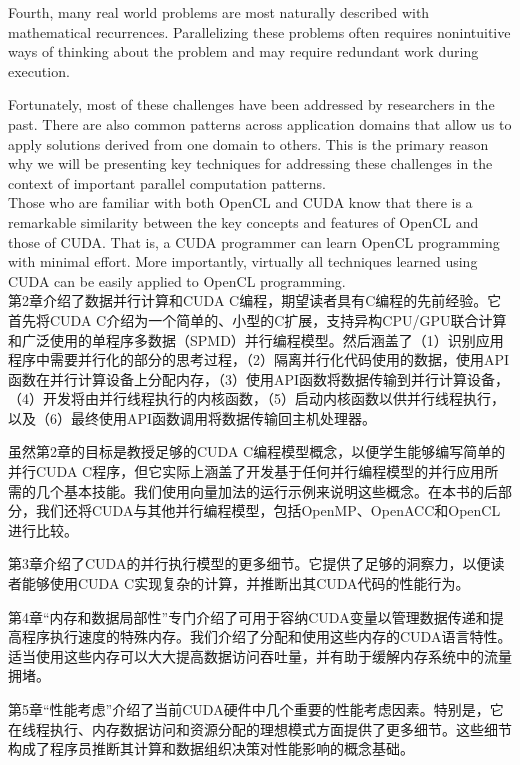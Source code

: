 \documentclass[11pt]{ctexart}
\begin{document}
Fourth, many real world problems are most naturally described with mathematical recurrences. Parallelizing these problems often requires nonintuitive ways of thinking about the problem and may require redundant work during execution.

Fortunately, most of these challenges have been addressed by researchers in the past. There are also common patterns across application domains that allow us to apply solutions derived from one domain to others. This is the primary reason why we will be presenting key techniques for addressing these challenges in the context of important parallel computation patterns.\\


Those who are familiar with both OpenCL and CUDA know that there is a remarkable similarity between the key concepts and features of OpenCL and those of CUDA. That is, a CUDA programmer can learn OpenCL programming with
minimal effort. More importantly, virtually all techniques learned using CUDA can be easily applied to OpenCL programming.\\

第2章介绍了数据并行计算和CUDA C编程，期望读者具有C编程的先前经验。它首先将CUDA C介绍为一个简单的、小型的C扩展，支持异构CPU/GPU联合计算和广泛使用的单程序多数据（SPMD）并行编程模型。然后涵盖了（1）识别应用程序中需要并行化的部分的思考过程，（2）隔离并行化代码使用的数据，使用API函数在并行计算设备上分配内存，（3）使用API函数将数据传输到并行计算设备，（4）开发将由并行线程执行的内核函数，（5）启动内核函数以供并行线程执行，以及（6）最终使用API函数调用将数据传输回主机处理器。

虽然第2章的目标是教授足够的CUDA C编程模型概念，以便学生能够编写简单的并行CUDA C程序，但它实际上涵盖了开发基于任何并行编程模型的并行应用所需的几个基本技能。我们使用向量加法的运行示例来说明这些概念。在本书的后部分，我们还将CUDA与其他并行编程模型，包括OpenMP、OpenACC和OpenCL进行比较。

第3章介绍了CUDA的并行执行模型的更多细节。它提供了足够的洞察力，以便读者能够使用CUDA C实现复杂的计算，并推断出其CUDA代码的性能行为。

第4章“内存和数据局部性”专门介绍了可用于容纳CUDA变量以管理数据传递和提高程序执行速度的特殊内存。我们介绍了分配和使用这些内存的CUDA语言特性。适当使用这些内存可以大大提高数据访问吞吐量，并有助于缓解内存系统中的流量拥堵。

第5章“性能考虑”介绍了当前CUDA硬件中几个重要的性能考虑因素。特别是，它在线程执行、内存数据访问和资源分配的理想模式方面提供了更多细节。这些细节构成了程序员推断其计算和数据组织决策对性能影响的概念基础。
\end{document}
